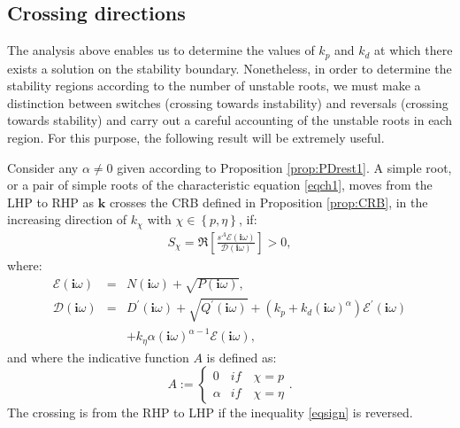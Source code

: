 \documentclass[twoside,reqno,11pt]{fcaa-var} %
\begin{document}
\subsection{Crossing directions}
The analysis above enables us to determine the values of $k_p$ and $k_d$ at which there exists a solution on the stability boundary. Nonetheless, in order to determine the stability regions according to the number of unstable roots, we must make a distinction between switches (crossing towards instability) and reversals (crossing towards stability) and carry out a careful accounting of the unstable roots in each region. For this purpose, the following result will be extremely useful.
\begin{proposition}\label{prop:cross}
	Consider any $\alpha\neq0$ given according to Proposition \ref{prop:PDrest1}. A simple root, or a pair of simple roots of the characteristic equation \eqref{eqch1}, moves from the LHP to RHP as $\mathbf{k}$ crosses the CRB defined in Proposition \ref{prop:CRB}, in the increasing direction of $k_\chi$ with $\chi\in\left\{p,\eta\right\}$, if:
	\begin{eqnarray}
	S_\chi=\Re\left[\tfrac{s^{A} \mathcal{E}(\bm{i}\omega)}{\mathcal{D}(\bm{i}\omega)}\right]>0, \label{eqsign}
	\end{eqnarray}
	where:
	\begin{eqnarray}
	\mathcal{E}(\bm{i}\omega)\!\!\!\!\!\!\!\!&=&\!\!\!\!\!\!\!\!N(\bm{i}\omega)+\sqrt{P(\bm{i}\omega)}, \\
	\mathcal{D}(\bm{i}\omega)\!\!\!\!\!\!\!\!&=&\!\!\!\!\!\!\!\!D^\prime(\bm{i}\omega)\!+\!\sqrt{Q^\prime(\bm{i}\omega)}\!+\!(k_p+k_d(\bm{i}\omega)^\alpha)\mathcal{E}^\prime(\bm{i}\omega) \nonumber\\
	& &+k_\eta\alpha(\bm{i}\omega)^{\alpha-1}\mathcal{E}(\bm{i}\omega), \label{eqsignden}
	\end{eqnarray}
	and where the indicative function $A$ is defined as:
	\begin{equation}
	A:=\begin{cases}0 & if \quad \chi=p \\
	\alpha  & if \quad  \chi=\eta \end{cases}.\label{Aexp}
	\end{equation}
	The crossing is from the RHP to LHP if the inequality \eqref{eqsign} is reversed.
\end{proposition} 
\end{document}
